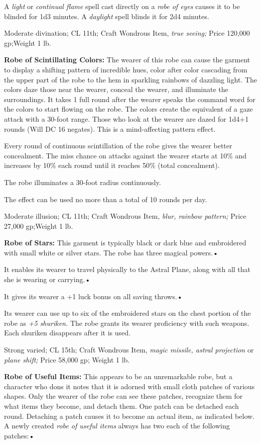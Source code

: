 A \textit{light }or \textit{continual flame }spell cast directly on a \textit{robe 
of eyes }causes it to be blinded for 1d3 minutes. A \textit{daylight }spell blinds 
it for 2d4 minutes.

Moderate divination; CL 11th; Craft Wondrous Item, \textit{true seeing; }Price 
120,000 gp;Weight 1 lb.

\textbf{Robe of Scintillating Colors:} The wearer of this robe can cause the garment 
to display a shifting pattern of incredible hues, color after color cascading from 
the upper part of the robe to the hem in sparkling rainbows of dazzling light. 
The colors daze those near the wearer, conceal the wearer, and illuminate the surroundings. 
It takes 1 full round after the wearer speaks the command word for the colors to 
start flowing on the robe. The colors create the equivalent of a gaze attack with 
a 30-foot range. Those who look at the wearer are dazed for 1d4+1 rounds (Will 
DC 16 negates). This is a mind-affecting pattern effect.

Every round of continuous scintillation of the robe gives the wearer better concealment. 
The miss chance on attacks against the wearer starts at 10\% and increases by 10\% 
each round until it reaches 50\% (total concealment).

The robe illuminates a 30-foot radius continuously.

The effect can be used no more than a total of 10 rounds per day.

Moderate illusion; CL 11th; Craft Wondrous Item, \textit{blur, rainbow pattern; 
}Price 27,000 gp;Weight 1 lb.

\textbf{Robe of Stars:} This garment is typically black or dark blue and embroidered 
with small white or silver stars. The robe has three magical powers.•

It enables its wearer to travel physically to the Astral Plane, along with all 
that she is wearing or carrying.•

It gives its wearer a +1 luck bonus on all saving throws.•

Its wearer can use up to six of the embroidered stars on the chest portion of the 
robe as \textit{+5 shuriken. }The robe grants its wearer proficiency with such 
weapons. Each shuriken disappears after it is used.

Strong varied; CL 15th; Craft Wondrous Item, \textit{magic missile, astral projection 
}or \textit{plane shift; }Price 58,000 gp; Weight 1 lb.

\textbf{Robe of Useful Items:} This appears to be an unremarkable robe, but a character 
who dons it notes that it is adorned with small cloth patches of various shapes. 
Only the wearer of the robe can see these patches, recognize them for what items 
they become, and detach them. One patch can be detached each round. Detaching a 
patch causes it to become an actual item, as indicated below. A newly created \textit{robe 
of useful items }always has two each of the following patches:•

